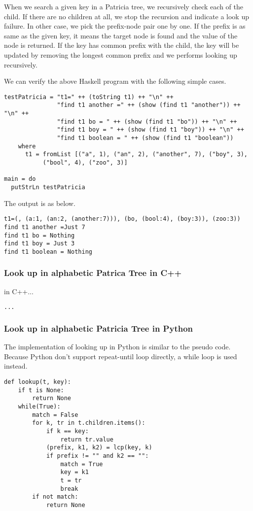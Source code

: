 \documentclass{article}
\begin{document}
When we search a given key in a Patricia tree, we recursively check each
of the child. If there are no children at all, we stop the recursion and 
indicate a look up failure. In other case, we pick the prefix-node pair
one by one. If the prefix is as same as the given key, it means the target
node is found and the value of the node is returned. If the key has common
prefix with the child, the key will be updated by removing the longest
common prefix and we performs looking up recursively.

We can verify the above Haskell program with the following simple cases.

\begin{lstlisting}
testPatricia = "t1=" ++ (toString t1) ++ "\n" ++
               "find t1 another =" ++ (show (find t1 "another")) ++ "\n" ++
               "find t1 bo = " ++ (show (find t1 "bo")) ++ "\n" ++
               "find t1 boy = " ++ (show (find t1 "boy")) ++ "\n" ++
               "find t1 boolean = " ++ (show (find t1 "boolean"))
    where
      t1 = fromList [("a", 1), ("an", 2), ("another", 7), ("boy", 3), 
           ("bool", 4), ("zoo", 3)]

main = do
  putStrLn testPatricia
\end{lstlisting}

The output is as below.

\begin{verbatim}
t1=(, (a:1, (an:2, (another:7))), (bo, (bool:4), (boy:3)), (zoo:3))
find t1 another =Just 7
find t1 bo = Nothing
find t1 boy = Just 3
find t1 boolean = Nothing
\end{verbatim}

\subsubsection*{Look up in alphabetic Patrica Tree in C++}
in C++...

\lstset{language=C++}
\begin{lstlisting}
...
\end{lstlisting}


\subsubsection*{Look up in alphabetic Patricia Tree in Python}
The implementation of looking up in Python is similar to the pseudo code.
Because Python don't support repeat-until loop directly, a while loop is
used instead.

\lstset{language=Python}
\begin{lstlisting}
def lookup(t, key):
    if t is None:
        return None
    while(True):
        match = False
        for k, tr in t.children.items():
            if k == key:
                return tr.value
            (prefix, k1, k2) = lcp(key, k)
            if prefix != "" and k2 == "":
                match = True
                key = k1
                t = tr
                break
        if not match:
            return None
\end{lstlisting}
\end{document}
